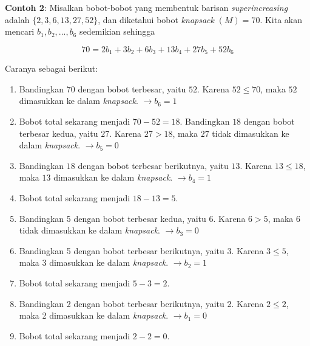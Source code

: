 \documentclass{article}
\begin{document}
\newpage


\textbf{Contoh 2}: Misalkan bobot-bobot yang membentuk barisan \textit{superincreasing} adalah $\{2, 3, 6, 13, 27, 52\}$, dan diketahui bobot \textit{knapsack} $(M) = 70$. Kita akan mencari $b_1, b_2, ..., b_6$ sedemikian sehingga

\[ 70 = 2b_1 + 3b_2 + 6b_3 + 13b_4 + 27b_5 + 52b_6 \]

Caranya sebagai berikut:

\begin{enumerate}
    \item Bandingkan $70$ dengan bobot terbesar, yaitu $52$. Karena $52 \le 70$, maka $52$ dimasukkan ke dalam \textit{knapsack}. $\rightarrow b_6 = 1$
    \item Bobot total sekarang menjadi $70 - 52 = 18$. Bandingkan $18$ dengan bobot terbesar kedua, yaitu $27$. Karena $27 > 18$, maka $27$ tidak dimasukkan ke dalam \textit{knapsack}. $\rightarrow b_5 = 0$
    \item Bandingkan $18$ dengan bobot terbesar berikutnya, yaitu $13$. Karena $13 \le 18$, maka $13$ dimasukkan ke dalam \textit{knapsack}. $\rightarrow b_4 = 1$
\end{enumerate}

\newpage


\begin{enumerate}
\setcounter{enumi}{3}
\item Bobot total sekarang menjadi $18 - 13 = 5$.
\item Bandingkan 5 dengan bobot terbesar kedua, yaitu 6. Karena $6 > 5$, maka 6 tidak dimasukkan ke dalam \textit{knapsack}. $\rightarrow b_3 = 0$
\item Bandingkan 5 dengan bobot terbesar berikutnya, yaitu 3. Karena $3 \le 5$, maka 3 dimasukkan ke dalam \textit{knapsack}. $\rightarrow b_2 = 1$
\item Bobot total sekarang menjadi $5 - 3 = 2$.
\item Bandingkan 2 dengan bobot terbesar berikutnya, yaitu 2. Karena $2 \le 2$, maka 2 dimasukkan ke dalam \textit{knapsack}. $\rightarrow b_1 = 0$
\item Bobot total sekarang menjadi $2 - 2 = 0$.
\end{enumerate}

\newpage

\end{document}
